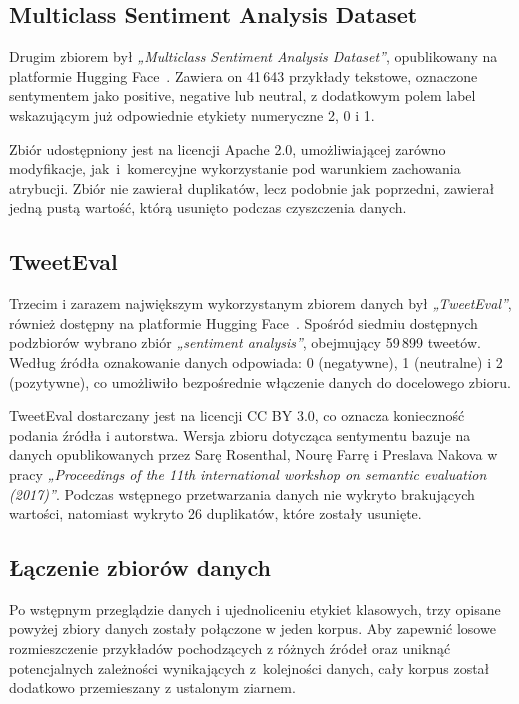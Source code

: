\subsection{Multiclass Sentiment Analysis Dataset}

Drugim zbiorem był \textit{„Multiclass Sentiment Analysis Dataset”}, opublikowany na platformie Hugging Face~\cite{MSAD}. Zawiera on 41\,643 przykłady tekstowe, oznaczone sentymentem jako positive, negative lub neutral, z dodatkowym polem label wskazującym już odpowiednie etykiety numeryczne 2, 0 i 1.

Zbiór udostępniony jest na licencji Apache 2.0, umożliwiającej zarówno modyfikacje, jak~i~komercyjne wykorzystanie pod warunkiem zachowania atrybucji. Zbiór nie zawierał duplikatów, lecz podobnie jak poprzedni, zawierał jedną pustą wartość, którą usunięto podczas czyszczenia danych.

\subsection{TweetEval}

Trzecim i zarazem największym wykorzystanym zbiorem danych był \textit{„TweetEval”}, również dostępny na platformie Hugging Face~\cite{TweetEval}. Spośród siedmiu dostępnych podzbiorów wybrano zbiór  \textit{„sentiment analysis”}, obejmujący 59\,899 tweetów. Według źródła oznakowanie danych odpowiada: 0 (negatywne), 1 (neutralne) i 2 (pozytywne), co umożliwiło bezpośrednie włączenie danych do docelowego zbioru.

TweetEval dostarczany jest na licencji CC BY 3.0, co oznacza konieczność podania źródła i autorstwa. Wersja zbioru dotycząca sentymentu bazuje na danych opublikowanych przez Sarę Rosenthal, Nourę Farrę i Preslava Nakova w pracy \textit{„Proceedings of the 11th international workshop on semantic evaluation (2017)”}. Podczas wstępnego przetwarzania danych nie wykryto brakujących wartości, natomiast wykryto 26 duplikatów, które zostały usunięte.

\subsection{Łączenie zbiorów danych}

Po wstępnym przeglądzie danych i ujednoliceniu etykiet klasowych, trzy opisane powyżej zbiory danych zostały połączone w jeden korpus. Aby zapewnić losowe rozmieszczenie przykładów pochodzących z różnych źródeł oraz uniknąć potencjalnych zależności wynikających z~kolejności danych, cały korpus został dodatkowo przemieszany z ustalonym ziarnem.

